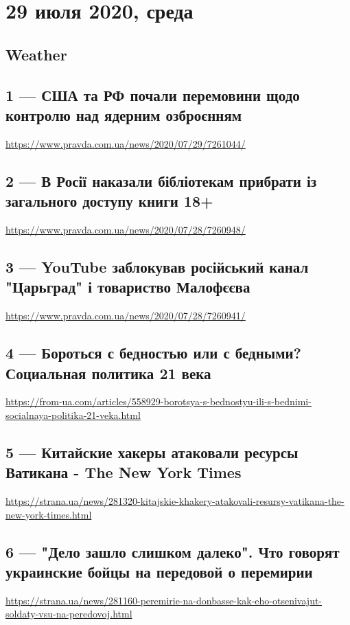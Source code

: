  


\clearpage
\section{29 июля 2020, среда}
\label{sec:29_07_2020}

\subsection{Weather}



\subsection{1 --- США та РФ почали перемовини щодо контролю над ядерним озброєнням}
\url{https://www.pravda.com.ua/news/2020/07/29/7261044/}

\subsection{2 --- В Росії наказали бібліотекам прибрати із загального доступу книги 18+}
\url{https://www.pravda.com.ua/news/2020/07/28/7260948/}

\subsection{3 --- YouTube заблокував російський канал "Царьград" і товариство Малофєєва}
\url{https://www.pravda.com.ua/news/2020/07/28/7260941/}

\subsection{4 --- Бороться с бедностью или с бедными? Социальная политика 21 века}
\url{https://from-ua.com/articles/558929-borotsya-s-bednostyu-ili-s-bednimi-socialnaya-politika-21-veka.html}

\subsection{5 --- Китайские хакеры атаковали ресурсы Ватикана - The New York Times}
\url{https://strana.ua/news/281320-kitajskie-khakery-atakovali-resursy-vatikana-the-new-york-times.html}

\subsection{6 --- "Дело зашло слишком далеко". Что говорят украинские бойцы на передовой о перемирии}
\url{https://strana.ua/news/281160-peremirie-na-donbasse-kak-eho-otsenivajut-soldaty-vsu-na-peredovoj.html}


 
